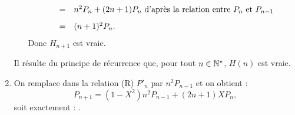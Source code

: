 \documentclass[a4paper, 11pt,reqno]{article}
\begin{document}
\begin{correction}
\begin{enumerate}
\begin{itemize}
$$\begin{array}{rcll}
					                     & = & n^2 P_n +(2n+1)P_n \textmd{ d'apr\`es la relation entre $P_n$ et $P_{n-1}$}\vsec \\
					                     & = & (n+1)^2 P_n.
				            \end{array}$$
			            Donc $H_{n+1}$ est vraie.
		      \end{itemize}
		      Il r\'esulte du principe de r\'ecurrence que, pour tout $n\in\mathbb{N}^\star$, $H(n)$ est vraie.
		\item On remplace dans la relation (R) $P'_n$ par $n^2 P_{n-1}$ et on obtient :
		      $$P_{n+1}=(1-X^2)n^2P_{n-1}+(2n+1)XP_n,$$
		      soit exactement : .
	\end{enumerate}
\end{correction}
\end{document}
